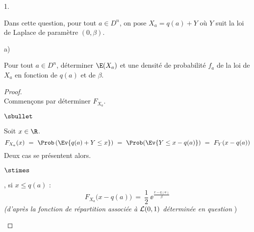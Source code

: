 \documentclass[11pt]{article}%
\begin{document}
\begin{noliste}{1.}
  \setlength{\itemsep}{4mm} %
  \setcounter{enumi}{13}
\item Dans cette question, pour tout $a\in D^n$, on pose $X_a = q(a) +
  Y$ où $Y$ suit la loi de Laplace de paramètre $(0, \beta)$.
  \begin{noliste}{a)}
    \setlength{\itemsep}{2mm} %
  \item Pour tout $a\in D^n$, déterminer $\E(X_a)$ et une densité de
    probabilité $f_a$ de la loi de $X_a$ en fonction de $q(a)$ et de
    $\beta$.
    
    \begin{proof}~\\%
      Commençons par déterminer $F_{X_a}$.
      \begin{noliste}{$\sbullet$}
      \item Soit $x \in \R$. 
        \[
        F_{X_a}(x) \ = \ \Prob\left(\Ev{q(a) + Y \leq x} \right) \ = \
        \Prob(\Ev{Y \leq x - q(a)}) \ = \ F_Y(x - q(a))
        \]
        Deux cas se présentent alors.
        \begin{noliste}{$\stimes$}
        \item {}, \ie si $x \leq q(a)$ :
          \[
          F_{X_a}\big(x - q(a) \big) \ = \ \dfrac{1}{2} \ \ee^{\frac{x -
              q(a)}{\beta}}
          \]
          {\it (d'après la fonction de répartition associée à ${\cal
              L}(0, 1)$ déterminée en question \itbf{3.b)}})
          
          
          \newpage
          

\end{noliste}
\end{noliste}
\end{proof}
\end{noliste}
\end{noliste}
\end{document}
